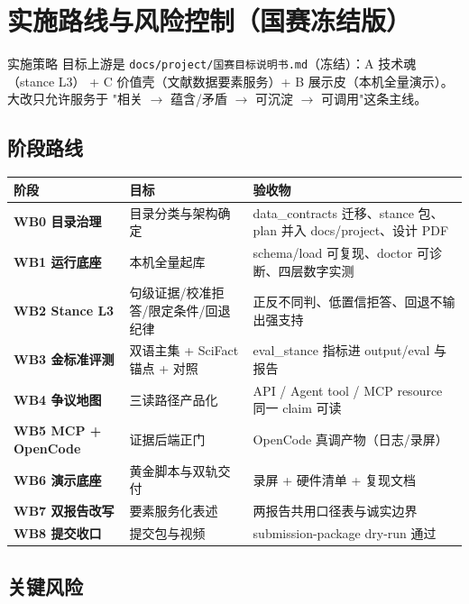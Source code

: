 \section{实施路线与风险控制（国赛冻结版）}

\begin{designbox}{实施策略}
目标上游是 \texttt{docs/project/国赛目标说明书.md}（冻结）：A 技术魂（stance L3）
+ C 价值壳（文献数据要素服务）+ B 展示皮（本机全量演示）。大改只允许服务于
"相关 $\rightarrow$ 蕴含/矛盾 $\rightarrow$ 可沉淀 $\rightarrow$ 可调用"这条主线。
\end{designbox}

\subsection{阶段路线}

\begin{center}
\begin{tabularx}{\textwidth}{>{\bfseries}p{26mm}X X}
\toprule
阶段 & 目标 & 验收物 \\
\midrule
WB0 目录治理 & 目录分类与架构确定 & data\_contracts 迁移、stance 包、plan 并入 docs/project、设计 PDF \\
WB1 运行底座 & 本机全量起库 & schema/load 可复现、doctor 可诊断、四层数字实测 \\
WB2 Stance L3 & 句级证据/校准拒答/限定条件/回退纪律 & 正反不同判、低置信拒答、回退不输出强支持 \\
WB3 金标准评测 & 双语主集 + SciFact 锚点 + 对照 & eval\_stance 指标进 output/eval 与报告 \\
WB4 争议地图 & 三读路径产品化 & API / Agent tool / MCP resource 同一 claim 可读 \\
WB5 MCP + OpenCode & 证据后端正门 & OpenCode 真调产物（日志/录屏） \\
WB6 演示底座 & 黄金脚本与双轨交付 & 录屏 + 硬件清单 + 复现文档 \\
WB7 双报告改写 & 要素服务化表述 & 两报告共用口径表与诚实边界 \\
WB8 提交收口 & 提交包与视频 & submission-package dry-run 通过 \\
\bottomrule
\end{tabularx}
\end{center}

\subsection{关键风险}

